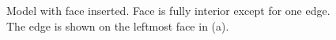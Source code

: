 \documentclass[a4paper, 12pt]{article}
\begin{document}
\begin{figure}[H]
  \centering
  \caption{Model with face inserted. Face is fully interior except for one edge.
        The edge is shown on the leftmost face in (a).}
  \label{fig:face3model}
\end{figure}
\end{document}
